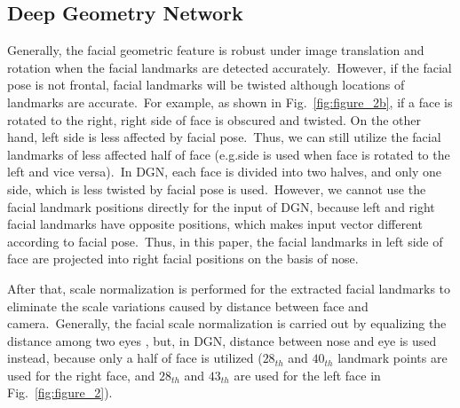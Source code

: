 \documentclass[10pt,twocolumn,letterpaper]{article}
\begin{document}
\subsection{Deep Geometry Network}
\label{section_DGN}
Generally, the facial geometric feature is robust under image translation and rotation when the facial landmarks are detected accurately.~However, if the facial pose is not frontal, facial landmarks will be twisted although locations of landmarks are accurate.~For example, as shown in Fig.~\ref{fig:figure_2b}, if a face is rotated to the right, right side of face is obscured and twisted. On the other hand, left side is less affected by facial pose.~Thus, we can still utilize the facial landmarks of less affected half of face (e.g.\right side is used when face is rotated to the left and vice versa).~In DGN, each face is divided into two halves, and only one side, which is less twisted by facial pose is used.~However, we cannot use the facial landmark positions directly for the input of DGN, because left and right facial landmarks have opposite positions, which makes input vector different according to facial pose.~Thus, in this paper, the facial landmarks in left side of face are projected into right facial positions on the basis of nose.

After that, scale normalization is performed for the extracted facial landmarks to eliminate the scale variations caused by distance between face and camera.~Generally, the facial scale normalization is carried out by equalizing the distance among two eyes \cite{Chen2006}, but, in DGN, distance between nose and eye is used instead, because only a half of face is utilized ($28_{th}$ and $40_{th}$ landmark points are used for the right face, and $28_{th}$ and $43_{th}$ are used for the left face in Fig.~\ref{fig:figure_2}). 
\end{document}

